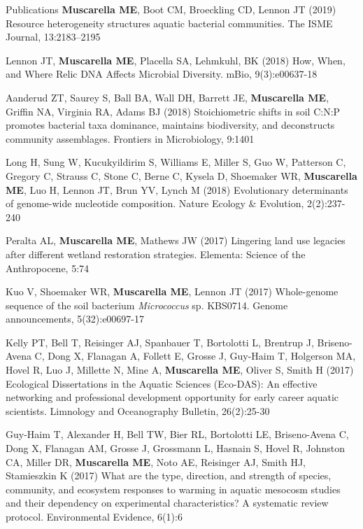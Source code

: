 \documentclass{resume} %
\begin{document}
\begin{rSection}{Publications}
{\bf Muscarella ME}, Boot CM, Broeckling CD, Lennon JT (2019) 
Resource heterogeneity structures aquatic bacterial communities. 
The ISME Journal, 13:2183–2195

Lennon JT, {\bf Muscarella ME}, Placella SA, Lehmkuhl, BK (2018)
How, When, and Where Relic DNA Affects Microbial Diversity.
mBio, 9(3):e00637-18

Aanderud ZT, Saurey S, Ball BA, Wall DH, Barrett JE, {\bf Muscarella ME}, Griffin NA, Virginia RA, Adams BJ (2018) 
Stoichiometric shifts in soil C:N:P promotes bacterial taxa dominance, maintains biodiversity, and deconstructs community assemblages. 
Frontiers in Microbiology, 9:1401

Long H, Sung W, Kucukyildirim S, Williams E, Miller S, Guo W, Patterson C, Gregory C, Strauss C, Stone C, 
Berne C, Kysela D, Shoemaker WR, {\bf Muscarella ME}, Luo H, Lennon JT, Brun YV, Lynch M (2018) 
Evolutionary determinants of genome-wide nucleotide composition. 
Nature Ecology \& Evolution, 2(2):237-240

Peralta AL, {\bf Muscarella ME}, Mathews JW (2017) 
Lingering land use legacies after different wetland restoration strategies.
Elementa: Science of the Anthropocene, 5:74

Kuo V, Shoemaker WR, {\bf Muscarella ME}, Lennon JT (2017) 
Whole-genome sequence of the soil bacterium {\em Micrococcus} sp. KBS0714.
Genome announcements, 5(32):e00697-17

Kelly PT, Bell T, Reisinger AJ, Spanbauer T, Bortolotti L, Brentrup J, Briseno-Avena C, Dong X,  Flanagan A, Follett E, Grosse J, Guy-Haim T, 
Holgerson MA, Hovel R, Luo J, Millette N, Mine A, {\bf Muscarella ME}, Oliver S, Smith H (2017) 
Ecological Dissertations in the Aquatic Sciences (Eco-DAS): An effective networking and professional development opportunity for early career aquatic scientists.
Limnology and Oceanography Bulletin, 26(2):25-30

Guy-Haim T, Alexander H, Bell TW, Bier RL, Bortolotti LE, Briseno-Avena C,
Dong X, Flanagan AM, Grosse J, Grossmann L, Hasnain S, Hovel R, Johnston CA,
Miller DR, {\bf Muscarella ME}, Noto AE, Reisinger AJ, Smith HJ, Stamieszkin K
(2017) What are the type, direction, and strength of species, community, and
ecosystem responses to warming in aquatic mesocosm studies and their dependency
on experimental characteristics? A systematic review protocol.
Environmental Evidence, 6(1):6


\end{rSection}
\end{document}
